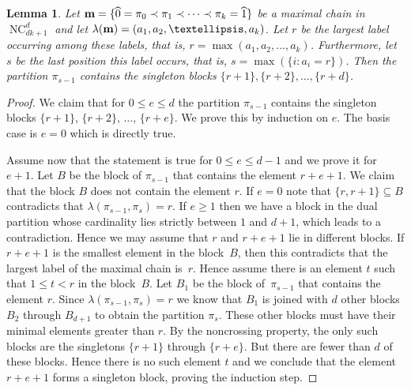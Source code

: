 \documentclass[11pt]{amsart}
\newtheorem{lemma}[theorem]{Lemma}
\numberwithin{equation}{section}
\newcommand{\hz}{\widehat{0}}
\newcommand{\ho}{\widehat{1}}
\newcommand{\coveredby}{\prec}
\DeclareMathOperator{\NC}{NC}
\begin{document}
\begin{lemma}
Let ${\bf m} = \{\hz = \pi_{0} \coveredby \pi_{1} \coveredby \cdots \coveredby \pi_{k} = \ho\}$
be a maximal chain in $\NC^{d}_{dk+1}$
and
let $\lambda({\bf m}) = (a_{1},a_{2}, \ldots, a_{k})$.
Let $r$ be the largest label occurring among these labels,
that is, $r = \max(a_{1}, a_{2}, \ldots, a_{k})$.
Furthermore, let $s$ be the last position this label occurs, that is,
$s = \max(\{i : a_{i} = r\})$. 
Then the partition $\pi_{s-1}$ contains the singleton blocks
$\{r+1\}, \{r+2\}, \ldots, \{r+d\}$.
\label{lemma_d_singleton_blocks}
\end{lemma}
\begin{proof}
We claim that for $0 \leq e \leq d$
the partition $\pi_{s-1}$ contains the singleton blocks
$\{r+1\}$, $\{r+2\}$, $\ldots$, $\{r+e\}$.
We prove this by induction on $e$.
The basis case is $e=0$ which is directly true.

Assume now that the statement is true for $0 \leq e \leq d-1$ and
we prove it for $e+1$.
Let $B$ be the block of $\pi_{s-1}$ that contains the element $r+e+1$.
We claim that the block $B$ does not contain the element $r$.
If $e=0$ note that $\{r,r+1\} \subseteq B$ contradicts that
$\lambda(\pi_{s-1},\pi_{s}) = r$.
If $e \geq 1$ 
then we have a block in the dual partition whose cardinality lies strictly
between $1$ and $d+1$, which leads to a contradiction.
Hence we may assume that $r$ and $r+e+1$ lie in different blocks.
If $r+e+1$ is the smallest element in the block~$B$, then this
contradicts that the largest label of the maximal chain is~$r$.
Hence assume there is an element $t$ such that $1 \leq t < r$ in the block~$B$.
Let $B_{1}$ be the block of~$\pi_{s-1}$ that contains the element $r$.
Since $\lambda(\pi_{s-1},\pi_{s}) = r$ we know that $B_{1}$ is
joined with $d$ other blocks $B_{2}$ through $B_{d+1}$
to obtain the partition $\pi_{s}$.
These other blocks must have their minimal elements greater than $r$.
By the noncrossing property, the only such blocks are
the singletons $\{r+1\}$ through $\{r+e\}$. But there are fewer than $d$
of these blocks. Hence there is no such element $t$ and we conclude
that the element $r+e+1$ forms a singleton block, proving the induction step.
\end{proof}
\end{document}
